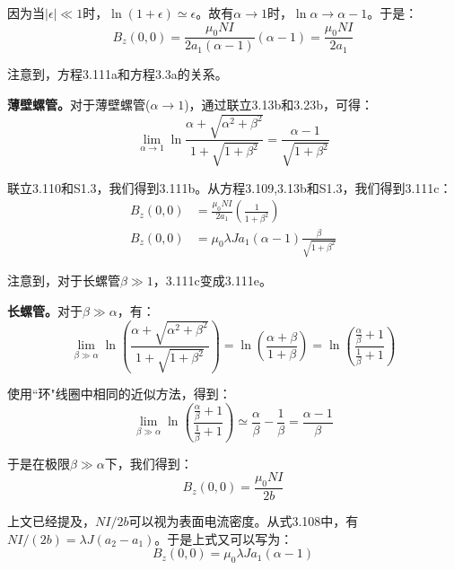 因为当$|\epsilon|\ll 1$时，$\ln (1+\epsilon)\simeq \epsilon$。故有$\alpha\rightarrow 1$时，$\ln \alpha\rightarrow \alpha-1$。于是：
\begin{equation*}
B_z(0,0)=\frac{\mu_0NI}{2a_1(\alpha-1)}(\alpha-1)=\frac{\mu_0NI}{2a_1}\tag{3.111}%
\end{equation*}

注意到，方程3.111a和方程3.3a的关系。

\textbf{薄壁螺管。}对于薄壁螺管($\alpha\rightarrow 1$)，通过联立3.13b和3.23b，可得：
\begin{equation*}
\lim_{\alpha\rightarrow 1}\ln\frac{\alpha+\sqrt{\alpha^2+\beta^2}}{1+\sqrt{1+\beta^2}}=\frac{\alpha-1}{\sqrt{1+\beta^2}} \tag{S1.3}%
\end{equation*}

联立3.110和S1.3，我们得到3.111b。从方程3.109,3.13b和S1.3，我们得到3.111c：
\begin{align*}
B_z(0,0)&=\frac{\mu_0 NI}{2a_1}(\frac{1}{1+\beta^2})\tag{3.111b}\\ %
B_z(0,0)&=\mu_0 \lambda Ja_1(\alpha-1)\frac{\beta}{\sqrt{1+\beta^2}}\tag{3.111c}%
\end{align*}

注意到，对于长螺管$\beta\gg 1$，3.111c变成3.111e。

\textbf{长螺管。}对于$\beta\gg \alpha$，有：
\begin{equation*}
\lim_{\beta\gg\alpha}\ln\left(\frac{\alpha+\sqrt{\alpha^2+\beta^2}}{1+\sqrt{1+\beta^2}}\right)=\ln\left(\frac{\alpha+\beta}{1+\beta}\right)=\ln\left(\frac{\frac{\alpha}{\beta}+1}{\frac{1}{\beta}+1}\right)%
\end{equation*}

使用``环"线圈中相同的近似方法，得到：
\begin{equation*}
\lim_{\beta\gg\alpha}\ln\left(\frac{\frac{\alpha}{\beta}+1}{\frac{1}{\beta}+1}\right)\simeq\frac{\alpha}{\beta}-\frac{1}{\beta}=\frac{\alpha-1}{\beta}%
\end{equation*}

于是在极限$\beta\gg\alpha$下，我们得到：
\begin{equation*}
B_z(0,0)=\frac{\mu_0NI}{2b} \tag{3.111d}%
\end{equation*}

上文已经提及，$NI/2b$可以视为表面电流密度。从式3.108中，有$NI/(2b)=\lambda J (a_2-a_1)$。于是上式又可以写为：
\begin{equation*}
B_z(0,0)=\mu_0\lambda Ja_1(\alpha-1) \tag{3.111e}%
\end{equation*}

